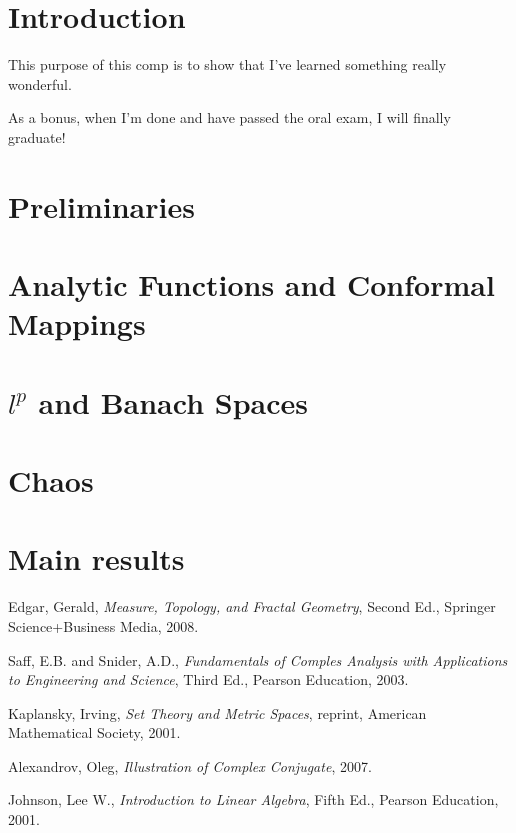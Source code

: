\documentclass[11pt]{article}
\theoremstyle{plain}
\theoremstyle{definition}
\begin{document}
\newpage
\doublespacing
\setcounter{page}{1}
\section{Introduction}

This purpose of this comp is to show that I've learned something really wonderful.

As a bonus, when I'm done and have passed the oral exam, I will finally graduate!


\newpage
\section{Preliminaries}


\newpage
\section{Analytic Functions and Conformal Mappings}


\newpage
\section{$l^p$ and Banach Spaces}


\newpage
\section{Chaos}


\newpage
\section{Main results}



\newpage  
\begin{thebibliography}{99}
\singlespacing
{} Edgar, Gerald, \emph{Measure, Topology, and Fractal Geometry}, Second Ed., Springer Science+Business Media, 2008.

 Saff, E.B. and Snider, A.D., \emph{Fundamentals of Comples Analysis with Applications to Engineering and Science}, Third Ed., Pearson Education, 2003.

 Kaplansky, Irving, \emph{Set Theory and Metric Spaces}, reprint, American Mathematical Society, 2001.

 Alexandrov, Oleg, \emph{Illustration of Complex Conjugate}, 2007.

 Johnson, Lee W., \emph{Introduction to Linear Algebra}, Fifth Ed., Pearson Education, 2001.

\end{thebibliography}

\end{document}
